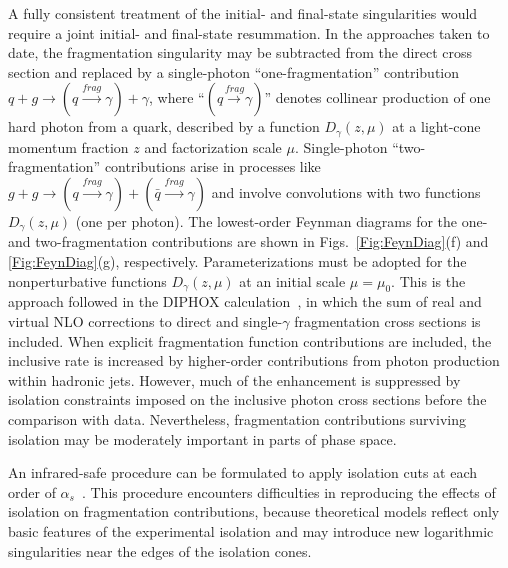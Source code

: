 \documentclass[12pt,english,aps,preprint,prd,letterpaper,fleqn,nofootinbib,showpacs,showkeys,tightenlines,floatfix]{revtex4}
\begin{document}
A fully consistent treatment of the initial- and final-state singularities
would require a joint initial- and final-state resummation. In the
approaches taken to date, the fragmentation singularity may be subtracted
from the direct cross section and replaced by a single-photon {}``one-fragmentation''
contribution $q+g\rightarrow(q\stackrel{frag}{\longrightarrow}\gamma)+\gamma$,
where {}``$(\stackrel{frag}{q\longrightarrow\gamma})$'' denotes
collinear production of one hard photon from a quark, described by
a function $D_{\gamma}(z,\mu)$ at a light-cone momentum fraction
$z$ and factorization scale $\mu$. Single-photon {}``two-fragmentation''
contributions arise in processes like $g+g\rightarrow(q\stackrel{frag}{\longrightarrow}\gamma)+(\bar{q}\stackrel{frag}{\longrightarrow}\gamma)$
and involve convolutions with two functions $D_{\gamma}(z,\mu)$ (one
per photon). The lowest-order Feynman diagrams for the one- and two-fragmentation
contributions are shown in Figs.~\ref{Fig:FeynDiag}(f) and \ref{Fig:FeynDiag}(g),
respectively. Parameterizations must be adopted for the nonperturbative
functions $D_{\gamma}(z,\mu)$ at an initial scale $\mu=\mu_{0}$.
This is the approach followed in the DIPHOX calculation~\cite{Binoth:1999qq},
in which the sum of real and virtual NLO corrections to direct and
single-$\gamma$ fragmentation cross sections is included. When explicit
fragmentation function contributions are included, the inclusive rate
is increased by higher-order contributions from photon production
within hadronic jets. However, much of the enhancement is suppressed
by isolation constraints imposed on the inclusive photon cross sections
before the comparison with data. Nevertheless, fragmentation contributions
surviving isolation may be moderately important in parts of phase
space.

An infrared-safe procedure can be formulated to apply isolation cuts
at each order of $\alpha_{s}$~\cite{Berger:1996vy,Catani:1998yh,Catani:2002ny}.
This procedure encounters difficulties in reproducing the effects
of isolation on fragmentation contributions, because theoretical models
reflect only basic features of the experimental isolation and may
introduce new logarithmic singularities near the edges of the isolation
cones.
\end{document}
